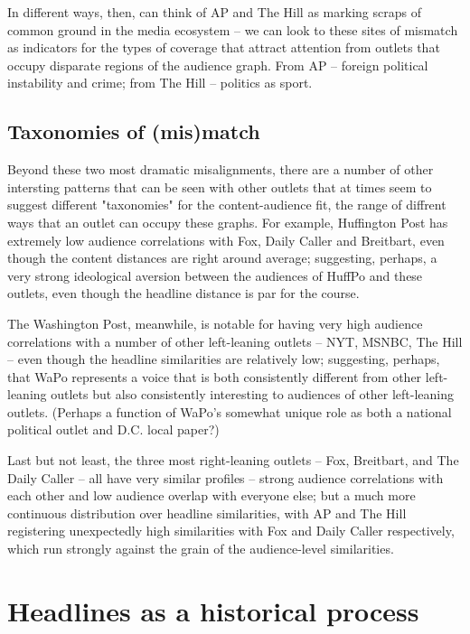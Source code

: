 \documentclass{scrartcl}
\begin{document}
In different ways, then, can think of AP and The Hill as marking scraps of common ground in the media ecosystem -- we can look to these sites of mismatch as indicators for the types of coverage that attract attention from outlets that occupy disparate regions of the audience graph. From AP -- foreign political instability and crime; from The Hill -- politics as sport.

\subsection{Taxonomies of (mis)match}

Beyond these two most dramatic misalignments, there are a number of other intersting patterns that can be seen with other outlets that at times seem to suggest different "taxonomies" for the content-audience fit, the range of diffrent ways that an outlet can occupy these graphs. For example, Huffington Post has extremely low audience correlations with Fox, Daily Caller and Breitbart, even though the content distances are right around average; suggesting, perhaps, a very strong ideological aversion between the audiences of HuffPo and these outlets, even though the headline distance is par for the course.


The Washington Post, meanwhile, is notable for having very high audience correlations with a number of other left-leaning outlets -- NYT, MSNBC, The Hill -- even though the headline similarities are relatively low; suggesting, perhaps, that WaPo represents a voice that is both consistently different from other left-leaning outlets but also consistently interesting to audiences of other left-leaning outlets. (Perhaps a function of WaPo's somewhat unique role as both a national political outlet and D.C. local paper?)


Last but not least, the three most right-leaning outlets -- Fox, Breitbart, and The Daily Caller -- all have very similar profiles -- strong audience correlations with each other and low audience overlap with everyone else; but a much more continuous distribution over headline similarities, with AP and The Hill registering unexpectedly high similarities with Fox and Daily Caller respectively, which run strongly against the grain of the audience-level similarities.


\section{Headlines as a historical process}
\end{document}
